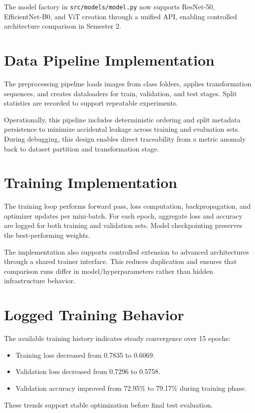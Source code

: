 The model factory in \texttt{src/models/model.py} now supports ResNet-50, EfficientNet-B0, and ViT creation through a unified API, enabling controlled architecture comparison in Semester 2.

\section{Data Pipeline Implementation}
The preprocessing pipeline loads images from class folders, applies transformation sequences, and creates dataloaders for train, validation, and test stages. Split statistics are recorded to support repeatable experiments.

Operationally, this pipeline includes deterministic ordering and split metadata persistence to minimize accidental leakage across training and evaluation sets. During debugging, this design enables direct traceability from a metric anomaly back to dataset partition and transformation stage.

\section{Training Implementation}
The training loop performs forward pass, loss computation, backpropagation, and optimizer updates per mini-batch. For each epoch, aggregate loss and accuracy are logged for both training and validation sets. Model checkpointing preserves the best-performing weights.

The implementation also supports controlled extension to advanced architectures through a shared trainer interface. This reduces duplication and ensures that comparison runs differ in model/hyperparameters rather than hidden infrastructure behavior.

\section{Logged Training Behavior}
The available training history indicates steady convergence over 15 epochs:
\begin{itemize}
\item Training loss decreased from 0.7835 to 0.6069.
\item Validation loss decreased from 0.7296 to 0.5758.
\item Validation accuracy improved from 72.95\% to 79.17\% during training phase.
\end{itemize}

These trends support stable optimization before final test evaluation.

